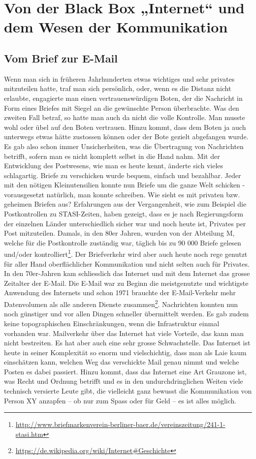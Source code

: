 \newpage
\section{Von der Black Box „Internet“ und dem Wesen der Kommunikation}

\subsection{Vom Brief zur E-Mail}
Wenn man sich in früheren Jahrhunderten etwas wichtiges und sehr privates mitzuteilen hatte, traf man sich persönlich, oder, wenn es die Distanz nicht erlaubte, engagierte man einen vertrauenswürdigen Boten, der die Nachricht in Form eines Briefes mit Siegel an die gewünschte Person überbrachte. Was den zweiten Fall betraf, so hatte man auch da nicht die volle Kontrolle. Man musste wohl oder übel auf den Boten vertrauen. Hinzu kommt, dass dem Boten ja auch unterwegs etwas hätte zustossen können oder der Bote gezielt abgefangen wurde. Es gab also schon immer Unsicherheiten, was die Übertragung von Nachrichten betrifft, sofern man es nicht komplett selbst in die Hand nahm. Mit der Entwicklung des Postwesens, wie man es heute kennt, änderte sich vieles schlagartig. Briefe zu verschicken wurde bequem, einfach und bezahlbar. Jeder mit den nötigen Kleinutensilien konnte nun Briefe um die ganze Welt schicken - vorausgesetzt natürlich, man konnte schreiben. Wie sieht es mit privaten bzw. geheimen Briefen aus? Erfahrungen aus der Vergangenheit, wie zum Beispiel die Postkontrollen zu STASI-Zeiten, haben gezeigt, dass es je nach Regierungsform der einzelnen Länder unterschiedlich sicher war und noch heute ist, Privates per Post mitzuteilen. Damals, in den 80er Jahren, wurden von der Abteilung M, welche für die Postkontrolle zuständig war, täglich bis zu 90 000 Briefe gelesen und/oder kontrolliert\footnote{\url{http://www.briefmarkenverein-berliner-baer.de/vereinszeitung/241-1-stasi.htm}}.
Der Briefverkehr wird aber auch heute noch rege genutzt für aller Hand oberflächlicher Kommunikation und nicht selten auch für Privates. In den 70er-Jahren kam schliesslich das Internet und mit dem Internet das grosse Zeitalter der E-Mail. Die E-Mail war zu Beginn die meistgenutzte und wichtigste Anwendung des Internets und schon 1971 brauchte der E-Mail-Verkehr mehr Datenvolumen als alle anderen Dienste zusammen\footnote{\url{https://de.wikipedia.org/wiki/Internet\#Geschichte}}.
Nachrichten konnten nun noch günstiger und vor allen Dingen schneller übermittelt werden. Es gab zudem keine topographischen Einschränkungen, wenn die Infrastruktur einmal vorhanden war. Mailverkehr über das Internet hat viele Vorteile, das kann man nicht bestreiten. Es hat aber auch eine sehr grosse Schwachstelle. Das Internet ist heute in seiner Komplexität so enorm und vielschichtig, dass man als Laie kaum einschätzen kann, welchen Weg das verschickte Mail genau nimmt und welche Posten es dabei passiert. Hinzu kommt, dass das Internet eine Art Grauzone ist, was Recht und Ordnung betrifft und es in den undurchdringlichen Weiten viele technisch versierte Leute gibt, die vielleicht ganz bewusst die Kommunikation von Person XY anzapfen – ob nur zum Spass oder für Geld – es ist alles möglich.

